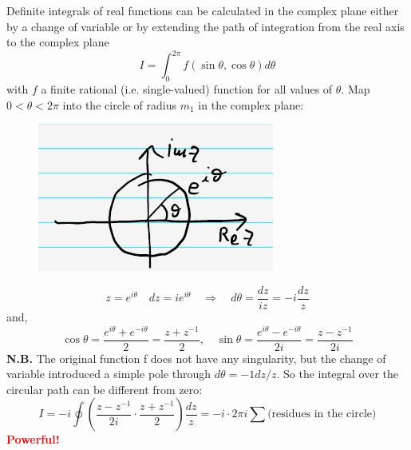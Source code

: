\documentclass{article}
\begin{document}
\noindent
Definite integrals of real functions can be calculated in the complex plane either by a change of variable or by extending the path of integration from the real axis to the complex plane
\begin{equation}
    I = \int_0^{2\pi} f(\sin\theta,\cos\theta)d\theta
\end{equation}
with $f$ a finite rational (i.e. single-valued) function for all values of $\theta$. Map $0<\theta<2\pi$ into the circle of radius $m_1$ in the complex plane:
\begin{figure}[h]
    \centering
    \includegraphics[width=0.3\linewidth]{fig35.png}
\end{figure}
$$z = e^{i\theta} \quad dz = ie^{i\theta} \quad \Rightarrow \quad d\theta = \frac{dz}{iz} = -i\frac{dz}{z}$$
and,
\begin{equation}
    \cos \theta = \frac{e^{i\theta} + e^{-i\theta}}{2} = \frac{z + z^{-1}}{2}, \quad
\sin \theta = \frac{e^{i\theta} - e^{-i\theta}}{2i} = \frac{z - z^{-1}}{2i}
\end{equation}
\textbf{N.B.} The original function f does not have any singularity, but the change of variable introduced a simple pole through $d\theta=-1dz/z$. So the integral over the circular path can be different from zero:
\begin{equation}
    I = -i \oint \left( \frac{z - z^{-1}}{2i} \cdot \frac{z + z^{-1}}{2} \right) \frac{dz}{z}
= -i \cdot 2\pi i \sum \text{(residues in the circle)}
\end{equation}
\textcolor{red}{\textbf{Powerful!}}

\newpage
\end{document}
